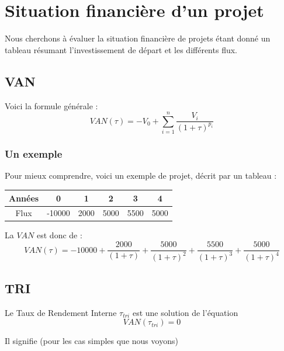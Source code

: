 \documentclass{article}
\begin{document}
\section {Situation financière d'un projet}
Nous cherchons à évaluer la situation financière de projets étant donné un tableau résumant l'investissement de départ et les différents flux.
\subsection{VAN}
Voici la formule générale :
$$\boxed{VAN(\tau) = -V_0 + \sum_{i=1}^n \dfrac{V_i}{(1+\tau)^{p_i}}}$$

\subsubsection{Un exemple}
Pour mieux comprendre, voici un exemple de projet, décrit par un tableau : 
\begin{center}
\begin{tabular}{ |c|c|c|c|c|c| } 
 \hline
 Années & 0 & 1 & 2 & 3 & 4\\ \hline
 Flux & -10000 & 2000 & 5000 & 5500 & 5000\\ \hline
\end{tabular}
\end{center}
La $VAN$ est donc de :
$$VAN(\tau) = -10000 + \dfrac{2000}{(1+\tau)} + \dfrac{5000}{(1+\tau)^2} + \dfrac{5500}{(1+\tau)^3} + \dfrac{5000}{(1+\tau)^4}$$

\subsection{TRI}
Le Taux de Rendement Interne $\tau_{tri}$ est une solution de l'équation 
$$VAN(\tau_{tri}) = 0$$

Il signifie (pour les cas simples que nous voyons)
\end{document}
